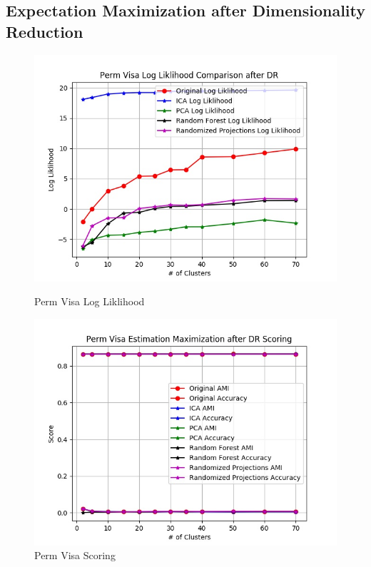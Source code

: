 \documentclass[h]{article}
\begin{document}
\subsection*{Expectation Maximization after Dimensionality Reduction}

 \begin{figure}[H]
      \includegraphics[width=1\textwidth,keepaspectratio]{perm_visa_log_liklihood_comparison_after_dr.jpg} 
      \caption*{Perm Visa Log Liklihood} 
   \endminipage\hfill
      \includegraphics[width=1\textwidth,keepaspectratio]{perm_visa_estimation_maximization_after_dr_scoring.jpg} 
      \caption*{Perm Visa Scoring} 
   \endminipage\hfill

\end{figure}
\end{document}
